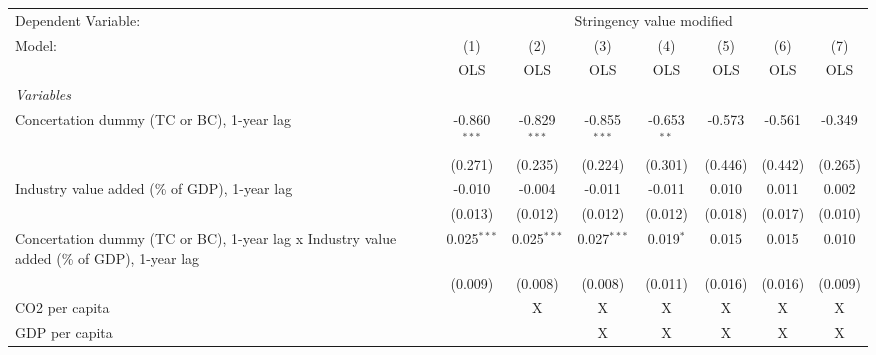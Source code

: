 
\begingroup
\centering
\begin{tabular}{lccccccc}
   \toprule
   Dependent Variable: & \multicolumn{7}{c}{Stringency value modified}\\
   Model:                                                                                    & (1)            & (2)            & (3)            & (4)           & (5)     & (6)     & (7)\\  
                                                                                             &  OLS           & OLS            & OLS            & OLS           & OLS     & OLS     & OLS\\  
   \midrule
   \emph{Variables}\\
   Concertation dummy (TC or BC), 1-year lag                                                 & -0.860$^{***}$ & -0.829$^{***}$ & -0.855$^{***}$ & -0.653$^{**}$ & -0.573  & -0.561  & -0.349\\   
                                                                                             & (0.271)        & (0.235)        & (0.224)        & (0.301)       & (0.446) & (0.442) & (0.265)\\   
   Industry value added (\% of GDP), 1-year lag                                              & -0.010         & -0.004         & -0.011         & -0.011        & 0.010   & 0.011   & 0.002\\   
                                                                                             & (0.013)        & (0.012)        & (0.012)        & (0.012)       & (0.018) & (0.017) & (0.010)\\   
   Concertation dummy (TC or BC), 1-year lag x Industry value added (\% of GDP), 1-year lag  & 0.025$^{***}$  & 0.025$^{***}$  & 0.027$^{***}$  & 0.019$^{*}$   & 0.015   & 0.015   & 0.010\\   
                                                                                             & (0.009)        & (0.008)        & (0.008)        & (0.011)       & (0.016) & (0.016) & (0.009)\\   
   CO2 per capita                                                                            &                & X              & X              & X             & X       & X       & X\\  
   GDP per capita                                                                            &                &                & X              & X             & X       & X       & X\\  

\end{tabular}
